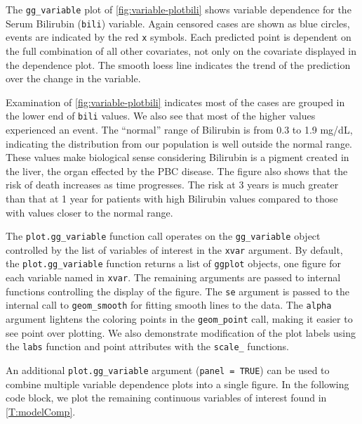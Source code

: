 \documentclass[article, nojss]{jss}
\begin{document}
The \texttt{gg\_variable} plot of \autoref{fig:variable-plotbili} shows
variable dependence for the Serum Bilirubin (\texttt{bili}) variable.
Again censored cases are shown as blue circles, events are indicated by
the red \texttt{x} symbols. Each predicted point is dependent on the
full combination of all other covariates, not only on the covariate
displayed in the dependence plot. The smooth loess line
\citep{cleveland:1981, cleveland:1988} indicates the trend of the
prediction over the change in the variable.

Examination of \autoref{fig:variable-plotbili} indicates most of the
cases are grouped in the lower end of \texttt{bili} values. We also see
that most of the higher values experienced an event. The ``normal''
range of Bilirubin is from 0.3 to 1.9 mg/dL, indicating the distribution
from our population is well outside the normal range. These values make
biological sense considering Bilirubin is a pigment created in the
liver, the organ effected by the PBC disease. The figure also shows that
the risk of death increases as time progresses. The risk at 3 years is
much greater than that at 1 year for patients with high Bilirubin values
compared to those with values closer to the normal range.

The \texttt{plot.gg\_variable} function call operates on the
\texttt{gg\_variable} object controlled by the list of variables of
interest in the \texttt{xvar} argument. By default, the
\texttt{plot.gg\_variable} function returns a list of \texttt{ggplot}
objects, one figure for each variable named in \texttt{xvar}. The
remaining arguments are passed to internal  functions
controlling the display of the figure. The \texttt{se} argument is
passed to the internal call to \texttt{geom\_smooth} for fitting smooth
lines to the data. The \texttt{alpha} argument lightens the coloring
points in the \texttt{geom\_point} call, making it easier to see point
over plotting. We also demonstrate modification of the plot labels using
the \texttt{labs} function and point attributes with the
\texttt{scale\_} functions.

An additional \texttt{plot.gg\_variable} argument
(\texttt{panel\ =\ TRUE}) can be used to combine multiple variable
dependence plots into a single figure. In the following code block, we
plot the remaining continuous variables of interest found in
\autoref{T:modelComp}.
\end{document}
